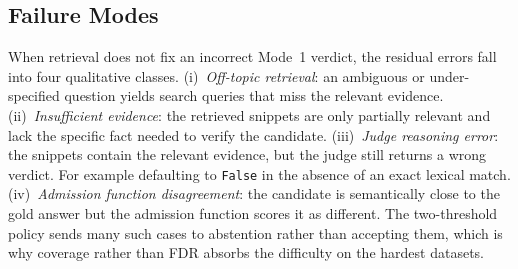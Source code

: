 \subsection{Failure Modes}
\label{app:failuremodes}
When retrieval does not fix an incorrect Mode~1 verdict, the residual errors fall into four qualitative classes. (i)~\emph{Off-topic retrieval}: an ambiguous or under-specified question yields search queries that miss the relevant evidence. (ii)~\emph{Insufficient evidence}: the retrieved snippets are only partially relevant and lack the specific fact needed to verify the candidate. (iii)~\emph{Judge reasoning error}: the snippets contain the relevant evidence, but the judge still returns a wrong verdict. For example defaulting to \texttt{False} in the absence of an exact lexical match. (iv)~\emph{Admission function disagreement}: the candidate is semantically close to the gold answer but the admission function scores it as different. The two-threshold policy sends many such cases to abstention rather than accepting them, which is why coverage rather than FDR absorbs the difficulty on the hardest datasets.

